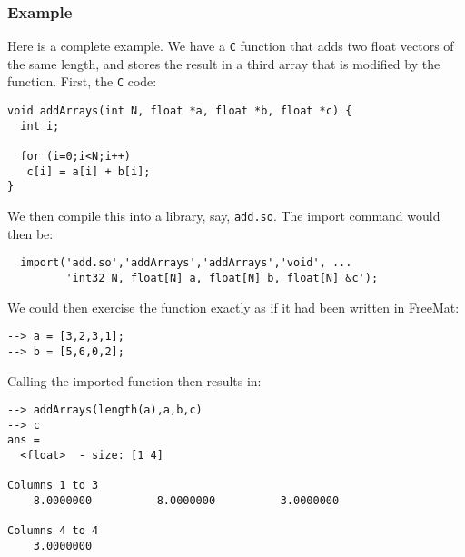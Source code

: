 \subsubsection{Example}
Here is a complete example.  We have a \verb|C| function that adds
two float vectors of the same length, and stores the result in a third array 
that is modified by the function.  First, the \verb|C| code:
\begin{verbatim}
void addArrays(int N, float *a, float *b, float *c) {
  int i;
 
  for (i=0;i<N;i++)
   c[i] = a[i] + b[i];
}
\end{verbatim}
We then compile this into a library, say, \verb|add.so|.  The import 
command would then be:
\begin{verbatim}
  import('add.so','addArrays','addArrays','void', ...
         'int32 N, float[N] a, float[N] b, float[N] &c');
\end{verbatim}
We could then exercise the function exactly as if it had been written
in FreeMat:
\begin{verbatim}
--> a = [3,2,3,1];
--> b = [5,6,0,2];
\end{verbatim}
Calling the imported function then results in:
\begin{verbatim}
--> addArrays(length(a),a,b,c)
--> c
ans =
  <float>  - size: [1 4]
  
Columns 1 to 3
    8.0000000          8.0000000          3.0000000
  
Columns 4 to 4
    3.0000000
\end{verbatim}
